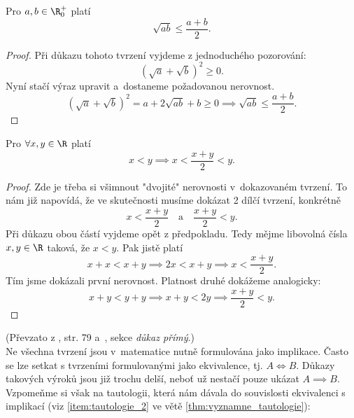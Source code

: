 \begin{proposition}[AG nerovnost]
    Pro $a,b\in\R_0^+$ platí
    \begin{equation*}
        \sqrt{ab}\leq\dfrac{a+b}{2}.
    \end{equation*}
\end{proposition}
\begin{proof}
    Při důkazu tohoto tvrzení vyjdeme z jednoduchého pozorování:
    \begin{equation*}
        (\sqrt{a}+\sqrt{b})^2\geq 0.
    \end{equation*}
    Nyní stačí výraz upravit a~dostaneme požadovanou nerovnost.
    \begin{equation*}
        (\sqrt{a}+\sqrt{b})^2 = a+2\sqrt{ab}+b\geq 0 \implies \sqrt{ab}\leq \dfrac{a+b}{2}.
    \end{equation*}
\end{proof}
\begin{proposition}
    Pro $\forall x,y\in\R$ platí
    \begin{equation*}
        x<y \implies x<\dfrac{x+y}{2}<y.
    \end{equation*}
\end{proposition}
\begin{proof}
    Zde je třeba si všimnout "dvojité" nerovnosti v~dokazovaném tvrzení. To nám již napovídá, že ve skutečnosti musíme dokázat 2 dílčí tvrzení, konkrétně
    \begin{equation*}
        x < \dfrac{x+y}{2}\quad\text{a}\quad\dfrac{x+y}{2} < y.
    \end{equation*}
    Při důkazu obou částí vyjdeme opět z předpokladu. Tedy mějme libovolná čísla $x,y\in\R$ taková, že $x<y$. Pak jistě platí
    \begin{equation*}
        x+x<x+y \implies 2x<x+y \implies x<\dfrac{x+y}{2}.
    \end{equation*}
    Tím jsme dokázali první nerovnost. Platnost druhé dokážeme analogicky:
    \begin{equation*}
        x+y<y+y \implies x+y<2y \implies \dfrac{x+y}{2}<y.
    \end{equation*}
\end{proof}
(Převzato z \cite{ChartrandPolimeniZhang2014}, str. 79 a~\cite{MatematickaLogikaUK2010}, sekce \emph{důkaz přímý}.)\\
Ne všechna tvrzení jsou v~matematice nutně formulována jako implikace. Často se lze setkat s tvrzeními formulovanými jako ekvivalence, tj. $A \iff B$. Důkazy takových výroků jsou již trochu delší, neboť už nestačí pouze ukázat $A \implies B$. Vzpomeňme si však na tautologii, která nám dávala do souvislosti ekvivalenci s implikací (viz \ref{item:tautologie_2} ve větě \ref{thm:vyznamne_tautologie}):
